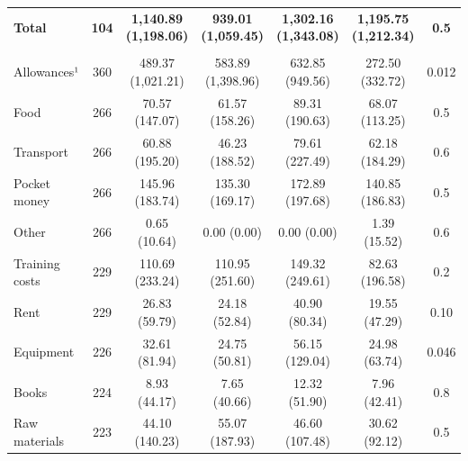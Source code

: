 \documentclass[
  11pt,
a4paper
]{article}
\begin{document}
\begin{table}[H]
{\begin{threeparttable}
\begin{tabular}[t]{lcccccc}
\textbf{\hspace{1em}Total} & \textbf{104} & \textbf{1,140.89 (1,198.06)} & \textbf{939.01 (1,059.45)} & \textbf{1,302.16 (1,343.08)} & \textbf{1,195.75 (1,212.34)} & \textbf{0.5}\\
\addlinespace[0.3em]
\multicolumn{7}{l}{\textbf{Costs}}\\
\hspace{1em}Allowances¹ & 360 & 489.37 (1,021.21) & 583.89 (1,398.96) & 632.85 (949.56) & 272.50 (332.72) & 0.012\\
\hspace{1em}\hspace{1em}Food & 266 & 70.57 (147.07) & 61.57 (158.26) & 89.31 (190.63) & 68.07 (113.25) & 0.5\\
\hspace{1em}\hspace{1em}Transport & 266 & 60.88 (195.20) & 46.23 (188.52) & 79.61 (227.49) & 62.18 (184.29) & 0.6\\
\hspace{1em}\hspace{1em}Pocket money & 266 & 145.96 (183.74) & 135.30 (169.17) & 172.89 (197.68) & 140.85 (186.83) & 0.5\\
\hspace{1em}\hspace{1em}Other & 266 & 0.65 (10.64) & 0.00 (0.00) & 0.00 (0.00) & 1.39 (15.52) & 0.6\\
\hspace{1em}Training costs & 229 & 110.69 (233.24) & 110.95 (251.60) & 149.32 (249.61) & 82.63 (196.58) & 0.2\\
\hspace{1em}\hspace{1em}Rent & 229 & 26.83 (59.79) & 24.18 (52.84) & 40.90 (80.34) & 19.55 (47.29) & 0.10\\
\hspace{1em}\hspace{1em}Equipment & 226 & 32.61 (81.94) & 24.75 (50.81) & 56.15 (129.04) & 24.98 (63.74) & 0.046\\
\hspace{1em}\hspace{1em}Books & 224 & 8.93 (44.17) & 7.65 (40.66) & 12.32 (51.90) & 7.96 (42.41) & 0.8\\
\hspace{1em}\hspace{1em}Raw materials & 223 & 44.10 (140.23) & 55.07 (187.93) & 46.60 (107.48) & 30.62 (92.12) & 0.5\\

\end{tabular}
\end{threeparttable}}
\end{table}
\end{document}
